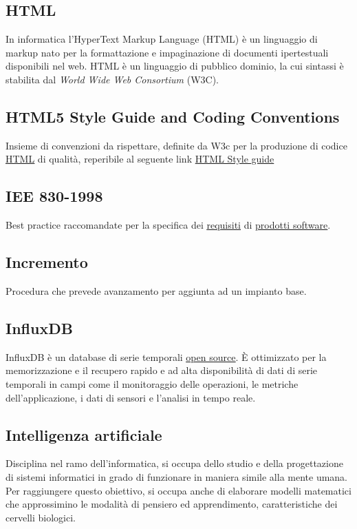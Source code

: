 	\subsection{HTML}
	\label{sec:html}
	In informatica l'HyperText Markup Language (HTML) è un linguaggio di markup  nato per la formattazione e impaginazione di documenti ipertestuali disponibili nel web. HTML è un linguaggio di pubblico dominio, la cui sintassi è stabilita dal \emph{World Wide Web Consortium} (W3C).
	\subsection{HTML5 Style Guide and Coding Conventions}
	\label{sec:htmlstyleguide}
	Insieme di convenzioni da rispettare, definite da W3c per la produzione di codice \underline{\hyperref[sec:html]{HTML}} di qualità, reperibile al seguente link \href{https://www.w3schools.com/html/html5_syntax.asp}{HTML Style guide}

	\newpage


	\subsection{IEE 830-1998}
	\label{sec:iee830}
	Best practice raccomandate per la specifica dei \underline{\hyperref[sec:requisito]{requisiti}} di \underline{\hyperref[sec:prodottosoftware]{prodotti software}}.


	\subsection{Incremento}
	\label{sec:incremento}
	Procedura che prevede avanzamento per aggiunta ad un impianto base.


	\subsection{InfluxDB}
	\label{sec:influxdb}
	InfluxDB è un database di serie temporali \underline{\hyperref[sec:opensource]{open source}}. È ottimizzato per la memorizzazione e il recupero rapido e ad alta disponibilità di dati di serie temporali in campi come il monitoraggio delle operazioni, le metriche dell'applicazione, i dati di sensori e l'analisi in tempo reale.


	\subsection{Intelligenza artificiale}
	\label{sec:ia}
	Disciplina nel ramo dell'informatica, si occupa dello studio e della progettazione di sistemi informatici in grado di funzionare in maniera simile alla mente umana. Per raggiungere questo obiettivo, si occupa anche di elaborare modelli matematici che approssimino le modalità di pensiero ed apprendimento, caratteristiche dei cervelli biologici.



